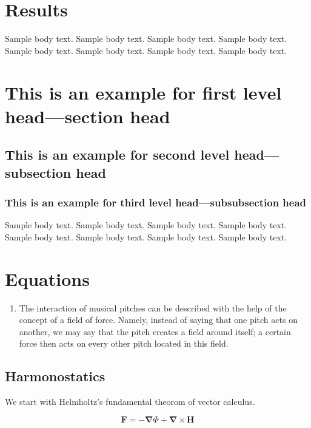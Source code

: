 \documentclass[sn-mathphys]{sn-jnl}%
\begin{document}
\section{Results}\label{sec2}

Sample body text. Sample body text. Sample body text. Sample body text. Sample body text. Sample body text. Sample body text. Sample body text.

\section{This is an example for first level head---section head}\label{sec3}

\subsection{This is an example for second level head---subsection head}\label{subsec2}

\subsubsection{This is an example for third level head---subsubsection head}\label{subsubsec2}

Sample body text. Sample body text. Sample body text. Sample body text. Sample body text. Sample body text. Sample body text. Sample body text. 

\section{Equations}\label{sec4}

\begin{enumerate}
\item The interaction of musical pitches can be described with the help of the concept of a field of force. Namely, instead of saying that one pitch acts on another, we may say that the pitch creates a field around itself; a certain force then acts on every other pitch located in this field.
\end{enumerate}

\subsection{Harmonostatics}

We start with Helmholtz's fundamental theorom of vector calculus.

\begin{equation}
  \boldsymbol{F} = -\boldsymbol{\nabla}\Phi + \boldsymbol{\nabla}\times\boldsymbol{H} \label{helmholtzEq}
\end{equation}
\end{document}
